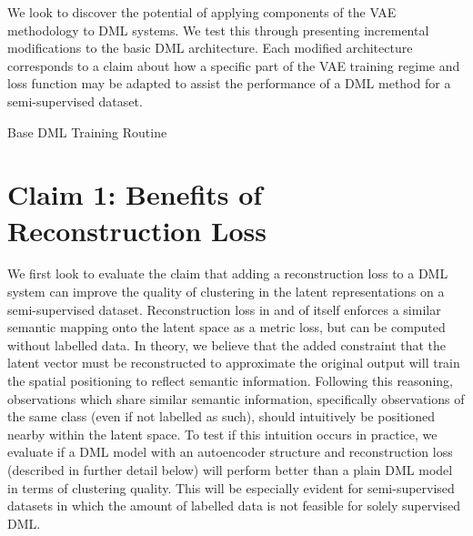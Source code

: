 \documentclass[./dissertation.tex]{subfiles}
\begin{document}
    We look to discover the potential of applying components of the VAE methodology to DML systems. We test this through presenting incremental modifications to the basic DML architecture. Each modified architecture corresponds to a claim about how a specific part of the VAE training regime and loss function may be adapted to assist the performance of a DML method for a semi-supervised dataset.
    

    \begin{algorithm}
    \caption{Base DML Training Routine}\label{alg:two}
    \end{algorithm}
     
    \section{Claim 1: Benefits of Reconstruction Loss}
    We first look to evaluate the claim that adding a reconstruction loss to a DML system can improve the quality of clustering in the latent representations on a semi-supervised dataset. Reconstruction loss in and of itself enforces a similar semantic mapping onto the latent space as a metric loss, but can be computed  without labelled data. In theory, we believe that the added constraint that the latent vector must be reconstructed to approximate the original output will train the spatial positioning to reflect semantic information. Following this reasoning, observations which share similar semantic information, specifically observations of the same class (even if not labelled as such), should intuitively be positioned nearby within the latent space. To test if this intuition occurs in practice, we evaluate if a DML model with an autoencoder structure and reconstruction loss (described in further detail below) will perform better than a plain DML model in terms of clustering quality. This will be especially evident for semi-supervised datasets in which the amount of labelled data is not feasible for solely supervised DML. \\
    
\end{document}
